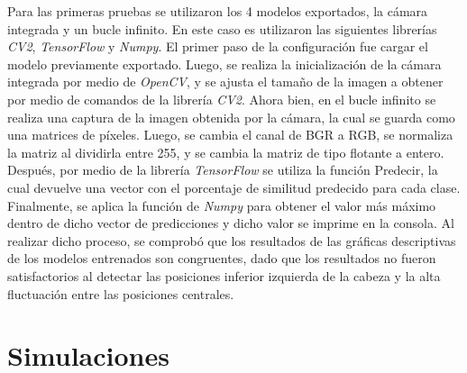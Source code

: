 Para las primeras pruebas se utilizaron los 4 modelos exportados, la cámara integrada y un bucle infinito. En este caso es utilizaron las siguientes librerías \textit{CV2}, \textit{TensorFlow} y \textit{Numpy}. El primer paso de la configuración fue cargar el modelo previamente exportado. Luego, se realiza la inicialización de la cámara integrada por medio de \textit{OpenCV}, y se ajusta el tamaño de la imagen a obtener por medio de comandos de la librería \textit{CV2}. 
Ahora bien, en el bucle infinito se realiza una captura de la imagen obtenida por la cámara, la cual se guarda como una matrices de píxeles. Luego, se cambia el canal de BGR a RGB, se normaliza la matriz al dividirla entre 255, y se cambia la matriz de tipo flotante a entero. Después, por medio de la librería \textit{TensorFlow} se utiliza la función Predecir, la cual devuelve una vector con el porcentaje de similitud predecido para cada clase. Finalmente, se aplica la función de \textit{Numpy} para obtener el valor más máximo dentro de dicho vector de predicciones y dicho valor se imprime en la consola.
Al realizar dicho proceso, se comprobó que los resultados de las gráficas descriptivas de los modelos entrenados son congruentes, dado que los resultados no fueron satisfactorios al detectar las posiciones inferior izquierda de la cabeza y la alta fluctuación entre las posiciones centrales.


\chapter{Simulaciones}


